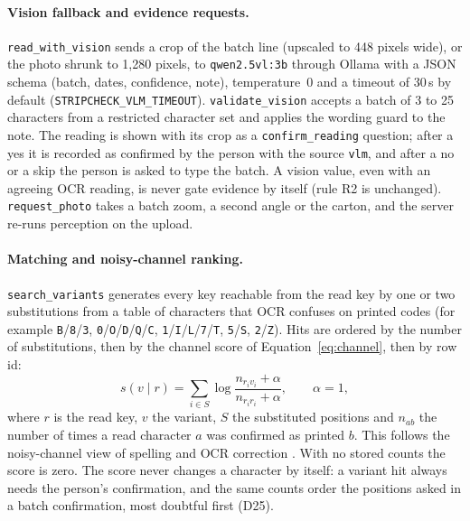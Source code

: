 \paragraph{Vision fallback and evidence requests.} \texttt{read\_with\_vision} sends a crop of the batch line (upscaled to 448 pixels wide), or the photo shrunk to 1{,}280 pixels, to \texttt{qwen2.5vl:3b} through Ollama with a JSON schema (batch, dates, confidence, note), temperature~0 and a timeout of 30\,s by default (\texttt{STRIPCHECK\_VLM\_TIMEOUT}). \texttt{validate\_vision} accepts a batch of 3 to 25 characters from a restricted character set and applies the wording guard to the note. The reading is shown with its crop as a \texttt{confirm\_reading} question; after a yes it is recorded as confirmed by the person with the source \texttt{vlm}, and after a no or a skip the person is asked to type the batch. A vision value, even with an agreeing OCR reading, is never gate evidence by itself (rule R2 is unchanged). \texttt{request\_photo} takes a batch zoom, a second angle or the carton, and the server re-runs perception on the upload.

\paragraph{Matching and noisy-channel ranking.} \texttt{search\_variants} generates every key reachable from the read key by one or two substitutions from a table of characters that OCR confuses on printed codes (for example \texttt{B}/\texttt{8}/\texttt{3}, \texttt{0}/\texttt{O}/\texttt{D}/\texttt{Q}/\texttt{C}, \texttt{1}/\texttt{I}/\texttt{L}/\texttt{7}/\texttt{T}, \texttt{5}/\texttt{S}, \texttt{2}/\texttt{Z}). Hits are ordered by the number of substitutions, then by the channel score of Equation~\eqref{eq:channel}, then by row id:
\begin{equation}
s(v \mid r) = \sum_{i \in S} \log \frac{n_{r_i v_i} + \alpha}{n_{r_i r_i} + \alpha}, \qquad \alpha = 1,
\label{eq:channel}
\end{equation}
where $r$ is the read key, $v$ the variant, $S$ the substituted positions and $n_{ab}$ the number of times a read character $a$ was confirmed as printed $b$. This follows the noisy-channel view of spelling and OCR correction \cite{kernighan1990spelling,brill2000improved,kolak2002ocr}. With no stored counts the score is zero. The score never changes a character by itself: a variant hit always needs the person's confirmation, and the same counts order the positions asked in a batch confirmation, most doubtful first (D25).

